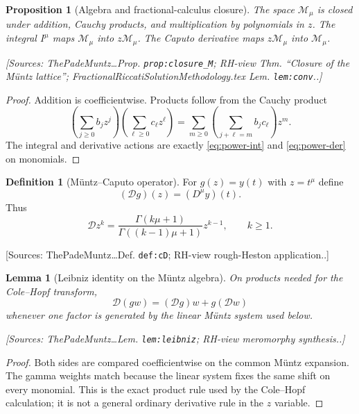 \documentclass[11pt]{article}
\newtheorem{lemma}[theorem]{Lemma}
\newtheorem{proposition}[theorem]{Proposition}
\theoremstyle{definition}
\newtheorem{definition}[theorem]{Definition}
\newcommand{\Dc}{\mathcal{D}}
\newcommand{\Source}[1]{\par\smallskip\noindent\textup{[Sources: #1.]}}
\begin{document}
\begin{proposition}[Algebra and fractional-calculus closure]\label{prop:muntz-closure}
The space $\mathcal{M}_{\mu}$ is closed under addition,
Cauchy products,
and multiplication by polynomials in $z$.
The integral $I^{\mu}$ maps $\mathcal{M}_{\mu}$ into $z\mathcal{M}_{\mu}$.
The Caputo derivative maps $z\mathcal{M}_{\mu}$ into $\mathcal{M}_{\mu}$.
\Source{ThePadeMuntz\ldots Prop. \texttt{prop:closure\_M}; RH-view Thm. ``Closure of the Müntz lattice''; FractionalRiccatiSolutionMethodology.tex Lem. \texttt{lem:conv}.}
\end{proposition}

\begin{proof}
Addition is coefficientwise.
Products follow from the Cauchy product
\[
        \left(\sum_{j\ge0}b_jz^j\right)
        \left(\sum_{\ell\ge0}c_\ell z^\ell\right)
        =\sum_{m\ge0}\left(\sum_{j+\ell=m}b_jc_\ell\right)z^m.
\]
The integral and derivative actions are exactly \eqref{eq:power-int} and \eqref{eq:power-der} on monomials.
\end{proof}

\begin{definition}[Müntz--Caputo operator]\label{def:muntz-caputo}
For $g(z)=y(t)$ with $z=t^{\mu}$ define
\begin{equation}\label{eq:muntz-caputo}
        (\Dc g)(z)=(D^{\mu}y)(t).
\end{equation}
Thus
\begin{equation}\label{eq:muntz-caputo-monomial}
        \Dc z^k=\frac{\Gamma(k\mu+1)}{\Gamma((k-1)\mu+1)}z^{k-1},
        \qquad k\ge1.
\end{equation}
\Source{ThePadeMuntz\ldots Def. \texttt{def:cD}; RH-view rough-Heston application.}
\end{definition}

\begin{lemma}[Leibniz identity on the Müntz algebra]\label{lem:muntz-leibniz}
On products needed for the Cole--Hopf transform,
\begin{equation}\label{eq:muntz-leibniz}
        \Dc(gw)=(\Dc g)w+g(\Dc w)
\end{equation}
whenever one factor is generated by the linear Müntz system used below.
\Source{ThePadeMuntz\ldots Lem. \texttt{lem:leibniz}; RH-view meromorphy synthesis.}
\end{lemma}

\begin{proof}
Both sides are compared coefficientwise on the common Müntz expansion.
The gamma weights match because the linear system fixes the same shift on every monomial.
This is the exact product rule used by the Cole--Hopf calculation;
it is not a general ordinary derivative rule in the $z$ variable.
\end{proof}
\end{document}
